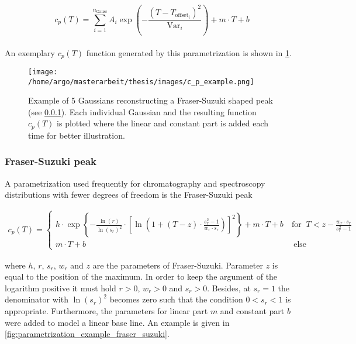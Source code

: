 \documentclass{scrartcl}[12pt, halfparskip]
\numberwithin{equation}{section}
\numberwithin{figure}{section}
\numberwithin{table}{section}
\newcommand{\var}{\operatorname{Var}}
\begin{document}
\begin{equation}
c_p(T) = \sum_{i=1}^{n_{\text{Gauss}}} A_i \exp\left(- \frac{(T - T_{\text{offset}_i})^2}{{\var}_i}\right) + m \cdot T + b
\label{eq:parametrization_linear_comb_Gauss}
\end{equation} \\

An exemplary $c_p(T)$ function generated by this parametrization is shown in \cref{fig:parametrization_example_linear_comb_gauss}.


\begin{figure}[H]
	\centering
	\texttt{[image: /home/argo/masterarbeit/thesis/images/c\_p\_example.png]}
	\caption{Example of 5 Gaussians reconstructing a Fraser-Suzuki shaped peak (see \cref{sec:parametrization_FS}). Each individual Gaussian and  the resulting function $c_p(T)$ is plotted where the linear and constant part is added each time for better illustration.}
	\label{fig:parametrization_example_linear_comb_gauss}
\end{figure}



\subsubsection{Fraser-Suzuki peak}
\label{sec:parametrization_FS}

A parametrization used frequently for chromatography and spectroscopy distributions with fewer degrees of freedom is the Fraser-Suzuki peak \cite{fraser_suzuki_1} \cite{fraser_suzuki_many_fcts}

\begin{align}
	c_p(T) =
	\begin{cases}
		h \cdot \exp \left\{ - \frac{\ln(r)}{\ln(s_r)^2} \cdot \left[ \ln\left( 1 + (T-z) \cdot \frac{s_r^2 - 1}{w_r \cdot s_r} \right) \right]^2 \right\} + m \cdot T + b \ & \text{for } \ T < z - \frac{w_r \cdot s_r}{s_r^2 - 1} \\
		m \cdot T + b \ & \ \text{else}
	\end{cases}
	\label{eq:fraser_suzuki}
\end{align}

where $h$, $r$, $s_r$, $w_r$ and $z$ are the parameters of Fraser-Suzuki. 
Parameter $z$ is equal to the position of the maximum.
In order to keep the argument of the logarithm positive it must hold $r > 0$, $w_r > 0$ and $s_r > 0$. Besides, at $s_r = 1$ the denominator with $\ln(s_r)^2$ becomes zero such that the condition $0 < s_r < 1$ is appropriate. Furthermore, the parameters for linear part $m$ and constant part $b$ were added to model a linear base line. An example is given in \cref{fig:parametrization_example_fraser_suzuki}.
\end{document}
